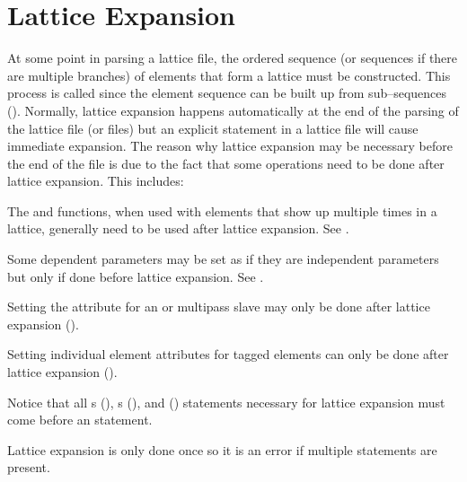 {{{%
\section{Lattice Expansion}
\label{s:expand}

At some point in parsing a lattice file, the ordered sequence (or sequences if there are multiple
branches) of elements that form a lattice must be constructed. This process is called  since the element sequence can be built up from sub--sequences
(). Normally, lattice expansion happens automatically at the end of the parsing of
the lattice file (or files) but an explicit  statement in a lattice file will cause
immediate expansion. The reason why lattice expansion may be necessary before the end of the file is
due to the fact that some operations need to be done after lattice expansion. This includes:
\begin{Itemize}
\item 
{}
The  and  functions, when used with elements
that show up multiple times in a lattice, generally need to be used
after lattice expansion. See .
\item
Some dependent parameters may be set as if they are independent
parameters but only if done before lattice expansion. See .
\item 
Setting the  attribute for an 
 or  multipass
slave may only be done after lattice expansion ().
\item
{}
Setting individual element attributes for tagged elements can only be done
after lattice expansion ().
\end{Itemize}

Notice that all s (), s (), and 
() statements necessary for lattice expansion must come before an 
statement.

Lattice expansion is only done once so it is an error if multiple
 statements are present.

}}}
